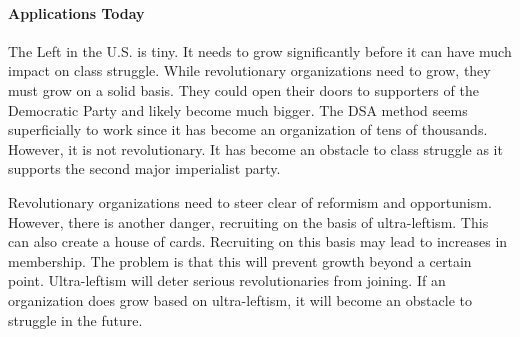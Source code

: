 \paragraph{Applications Today}

The Left in the U.S. is tiny. It needs to grow significantly before it can have much impact on class struggle. While revolutionary organizations need to grow, they must grow on a solid basis. They could open their doors to supporters of the Democratic Party and likely become much bigger. The DSA method seems superficially to work since it has become an organization of tens of thousands. However, it is not revolutionary. It has become an obstacle to class struggle as it supports the second major imperialist party.

Revolutionary organizations need to steer clear of reformism and opportunism. However, there is another danger, recruiting on the basis of ultra-leftism. This can also create a house of cards. Recruiting on this basis may lead to increases in membership. The problem is that this will prevent growth beyond a certain point. Ultra-leftism will deter serious revolutionaries from joining. If an organization does grow based on ultra-leftism, it will become an obstacle to struggle in the future.

